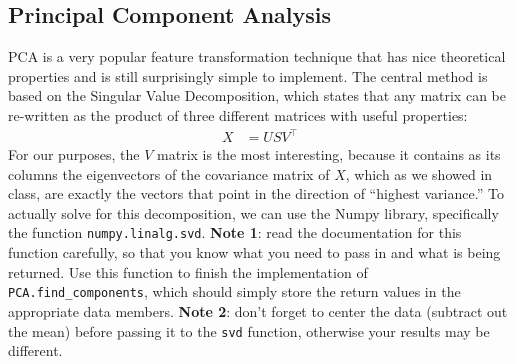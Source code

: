 \documentclass{article}
\begin{document}
\subsection*{Principal Component Analysis}
PCA is a very popular feature transformation technique that has nice theoretical properties and is still surprisingly simple to implement. The central method is based on the Singular Value Decomposition, which states that any matrix can be re-written as the product of three different matrices with useful properties:
\begin{align*}
	X &= U S V^\top
\end{align*}
For our purposes, the \(V\) matrix is the most interesting, because it contains as its columns the eigenvectors of the covariance matrix of \(X\), which as we showed in class, are exactly the vectors that point in the direction of ``highest variance.'' To actually solve for this decomposition, we can use the Numpy library, specifically the function \texttt{numpy.linalg.svd}. \textbf{Note 1}: read the documentation for this function carefully, so that you know what you need to pass in and what is being returned. Use this function to finish the implementation of \texttt{PCA.find\_components}, which should simply store the return values in the appropriate data members. \textbf{Note 2}: don't forget to center the data (subtract out the mean) before passing it to the \texttt{svd} function, otherwise your results may be different.
\end{document}

